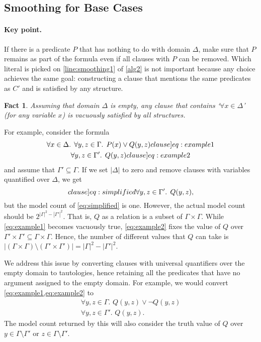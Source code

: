 \documentclass{article}
\newtheorem{fact}{Fact}
\theoremstyle{definition}
\begin{document}
\subsection{Smoothing for Base Cases}\label{sec:smoothingbase}


\paragraph{Key point.}
If there is a predicate $P$ that has nothing to do with domain $\Delta$, make
sure that $P$ remains as part of the formula even if all clauses with $P$ can be
removed. Which literal is picked on \cref{line:smoothing1} of \cref{alg2} is not
important because any choice achieves the same goal: constructing a clause that
mentions the same predicates as $C'$ and is satisfied by any structure.

\begin{fact}
  Assuming that domain $\Delta$ is empty, any clause that contains
  `$\forall x \in \Delta$' (for any variable $x$) is vacuously satisfied by all
  structures.
\end{fact}

For example, consider the formula
\begin{gather}
  \forall x \in \Delta\text{. }\forall y, z \in \Gamma\text{. }P(x) \lor Q(y, z)\label[clause]{eq:example1}\\
  \forall y, z \in \Gamma'\text{. }Q(y, z)\label[clause]{eq:example2}
\end{gather}
and assume that $\Gamma' \subseteq \Gamma$. If we set $|\Delta|$
to zero and remove clauses with variables quantified over $\Delta$, we get
\begin{equation}\label[clause]{eq:simplified}
  \forall y, z \in \Gamma'\text{. }Q(y, z),
\end{equation}
but the model count of \cref{eq:simplified} is one. However, the actual model
count should be $2^{|\Gamma|^2 - |\Gamma'|^2}$. That is, $Q$ as a relation is a
subset of $\Gamma \times \Gamma$. While \cref{eq:example1} becomes vacuously
true, \cref{eq:example2} fixes the value of $Q$ over
$\Gamma' \times \Gamma' \subseteq \Gamma \times \Gamma$. Hence, the number of
different values that $Q$ can take is
$|(\Gamma \times \Gamma) \setminus (\Gamma' \times \Gamma')| = |\Gamma|^{2} - |\Gamma'|^{2}$.

We address this issue by converting clauses with universal quantifiers over the
empty domain to tautologies, hence retaining all the predicates that have no
argument assigned to the empty domain. For example, we would convert
\cref{eq:example1,eq:example2} to
\begin{gather*}
  \forall y, z \in \Gamma\text{. }Q(y, z) \lor \neg Q(y, z)\\
  \forall y, z \in \Gamma'\text{. }Q(y, z).
\end{gather*}
The model count returned by this will also consider the truth value of $Q$ over
$y \in \Gamma \setminus \Gamma'$ or $z \in \Gamma \setminus \Gamma'$.
\end{document}
